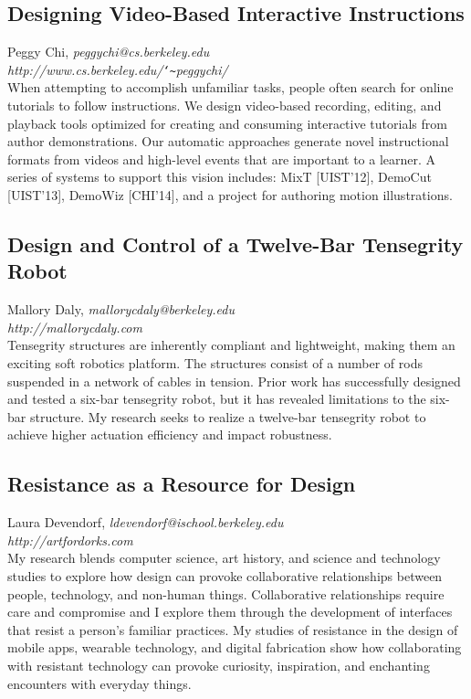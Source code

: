 \documentclass[foldmark,10pt,a4paper,notumble]{leaflet}
\newcommand{\name}[1]{#1,}
\newcommand{\email}[1]{\emph{#1}}
\newcommand{\website}[1]{\\\emph{#1}\\[3pt]}
\begin{document}
\subsection{Designing Video-Based Interactive Instructions}
\name{Peggy Chi}
\email{peggychi@cs.berkeley.edu}
\website{http://www.cs.berkeley.edu/\texttt{\char`\~}peggychi/}
When attempting to accomplish unfamiliar tasks, people often search for online tutorials to follow instructions. We design video-based recording, editing, and playback tools optimized for creating and consuming interactive tutorials from author demonstrations. Our automatic approaches generate novel instructional formats from videos and high-level events that are important to a learner. A series of systems to support this vision includes: MixT [UIST'12], DemoCut [UIST'13], DemoWiz [CHI'14], and a project for authoring motion illustrations.

\subsection{Design and Control of a Twelve-Bar Tensegrity Robot}
\name{Mallory Daly}
\email{mallorycdaly@berkeley.edu}
\website{http://mallorycdaly.com}
Tensegrity structures are inherently compliant and lightweight, making them an exciting soft robotics platform. The structures consist of a number of rods suspended in a network of cables in tension. Prior work has successfully designed and tested a six-bar tensegrity robot, but it has revealed limitations to the six-bar structure. My research seeks to realize a twelve-bar tensegrity robot to achieve higher actuation efficiency and impact robustness.

\subsection{Resistance as a Resource for Design}
\name{Laura Devendorf}
\email{ldevendorf@ischool.berkeley.edu}
\website{http://artfordorks.com}
My research blends computer science, art history, and science and technology studies to explore how design can provoke collaborative relationships between people, technology, and non-human things. Collaborative relationships require care and compromise and I explore them through the development of interfaces that resist a person’s familiar practices. My studies of resistance in the design of mobile apps, wearable technology, and digital fabrication show how collaborating with resistant technology can provoke curiosity, inspiration, and enchanting encounters with everyday things.
\end{document}
